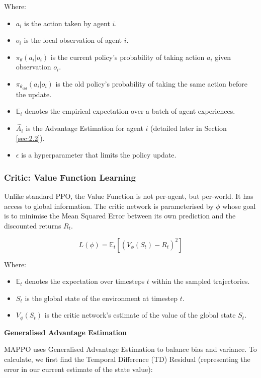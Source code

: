 Where:
\begin{itemize}[noitemsep, topsep=0pt]
\item $a_i$ is the action taken by agent $i$.
\item $o_i$ is the local observation of agent $i$.
\item $\pi_{\theta}(a_i | o_i)$ is the current policy's probability of taking action $a_i$ given observation $o_i$.
\item $\pi_{\theta_{old}}(a_i | o_i)$ is the old policy's probability of taking the same action before the update.
\item $\mathbb{E}_{i}$ denotes the empirical expectation over a batch of agent experiences.
\item $\hat{A}_i$ is the Advantage Estimation for agent $i$ (detailed later in Section \ref{sec:2.2}).
\item $\epsilon$ is a hyperparameter that limits the policy update.
\end{itemize}

\subsubsection{Critic: Value Function Learning}
\label{sec:2.2.2}

Unlike standard PPO, the Value Function is not per-agent, but per-world.
It has access to global information.
The critic network is parameterised by $\phi$ whose goal is to minimise the Mean Squared Error between its own prediction and the discounted returns $R_t$.

\begin{equation}
L(\phi) = \mathbb{E}_{t} \left[ (V_{\phi}(S_t) - R_t)^2 \right]
\end{equation}

Where:
\begin{itemize}[noitemsep, topsep=0pt]
\item $\mathbb{E}_{t}$ denotes the expectation over timesteps $t$ within the sampled trajectories.
\item $S_t$ is the global state of the environment at timestep $t$.
\item $V_{\phi}(S_t)$ is the critic network's estimate of the value of the global state $S_t$.
\end{itemize}

\textbf{Generalised Advantage Estimation}
\label{sec:2.2.3}

MAPPO uses Generalised Advantage Estimation \cite{formal-gae, GAE} to balance bias and variance.
To calculate, we first find the Temporal Difference (TD) Residual (representing the error in our current estimate of the state value):


